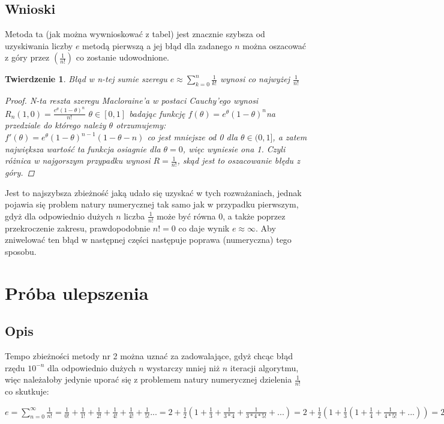 \documentclass{article}
\begin{document}
\subsection{Wnioski}
Metoda ta (jak można wywnioskować z tabel) jest znacznie szybsza od uzyskiwania liczby $e$ metodą pierwszą a jej błąd dla zadanego $n$ można oszacować z góry przez $(\frac{1}{n!})$ co zostanie udowodnione.
\newtheorem{sad}{Twierdzenie}
\begin{sad}

	Błąd w n-tej sumie szeregu $e \approx \sum_{k=0}^{n} \frac{1}{k!}$ wynosi co najwyżej $\frac{1}{n!}$
\begin{proof}
N-ta reszta szeregu Macloraine'a w postaci Cauchy'ego wynosi $R_{n}(1,0)=\frac{e^{\theta}(1-\theta)^{n}}{n!}$ \hspace{3mm} $\theta \in [0,1]$ badając funkcję $f(\theta) =  e^{\theta}(1-\theta)^{n}$na przedziale do którego należy $\theta$ otrzumujemy:
\newline 
$f'(\theta)= e^{\theta}(1-\theta)^{n-1}(1-\theta-n)$ co jest mniejsze od 0 dla $\theta \in (0,1]$, a zatem największa wartość ta funkcja osiagnie dla $\theta = 0$, więc wyniesie ona 1. Czyli różnica w najgorszym przypadku wynosi $R = \frac{1}{n!}$, skąd jest to oszacowanie błędu z góry.
\end{proof}
\end{sad}
Jest to najszybsza zbieżność jaką udało się uzyskać w tych rozważaniach, jednak pojawia się problem natury numerycznej tak samo jak w przypadku pierwszym, gdyż dla odpowiednio dużych $n$ liczba $\frac{1}{n!}$ może być równa 0, a także poprzez przekroczenie zakresu, prawdopodobnie $n! = 0$ co daje wynik $e \approx \infty$. Aby zniwelować ten błąd w następnej części następuje poprawa (numeryczna) tego sposobu.
\newpage
\section{Próba ulepszenia}
\subsection{Opis}
Tempo zbieżności metody nr 2 można uznać za zadowalające, gdyż chcąc błąd rzędu $10^{-n}$ dla odpowiednio dużych $n$ wystarczy mniej niż $n$ iteracji algorytmu, więc należałoby jedynie uporać się z problemem natury numerycznej dzielenia $\frac{1}{n!}$ co skutkuje:

$e = \sum_{n=0}^{\infty} \frac{1}{n!} =\frac{1}{0!} + \frac{1}{1!} + \frac{1}{2!} + \frac{1}{4!} + \frac{1}{4!} + \frac{1}{5!} ... = 2 + \frac{1}{2}(1 + \frac{1}{3} + \frac{1}{3*4} + \frac{1}{3*4*5!} + ...) =2 + \frac{1}{2}(1 + \frac{1}{3}(1+ \frac{1}{4} + \frac{1}{4*5!} + ...)) = 2 + \frac{1}{2}(1 + \frac{1}{3}(1+ \frac{1}{4}(1 + \frac{1}{5!}(1 + ...))))$
\end{document}
